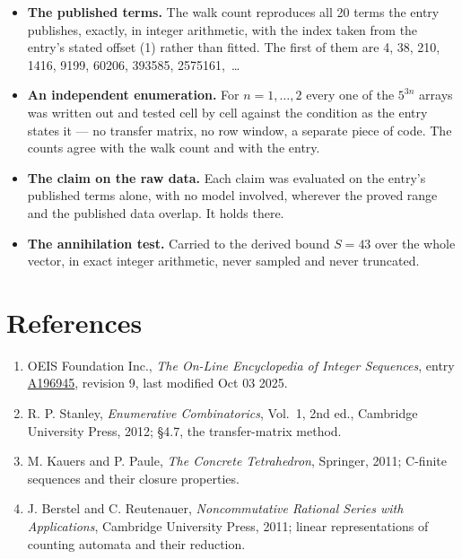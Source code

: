 \documentclass[11pt]{article}
\theoremstyle{definition}
\begin{document}
\begin{itemize}

\item {\bfseries The published terms.} The walk count reproduces all 20 terms the entry publishes, exactly, in integer arithmetic, with the index taken from the entry's stated offset (1) rather than fitted. The first of them are 4, 38, 210, 1416, 9199, 60206, 393585, 2575161,~\dots

\item {\bfseries An independent enumeration.} For $n = 1,\dots,2$ every one of the $5^{3n}$ arrays was written out and tested cell by cell against the condition as the entry states it --- no transfer matrix, no row window, a separate piece of code. The counts agree with the walk count and with the entry.

\item {\bfseries The claim on the raw data.} Each claim was evaluated on the entry's published terms alone, with no model involved, wherever the proved range and the published data overlap. It holds there.

\item {\bfseries The annihilation test.} Carried to the derived bound $S = 43$ over the whole vector, in exact integer arithmetic, never sampled and never truncated.

\end{itemize}

\section{References}

\begin{enumerate}

\item OEIS Foundation Inc., \emph{The On-Line Encyclopedia of Integer Sequences}, entry \href{https://oeis.org/A196945}{A196945}, revision 9, last modified Oct 03 2025.

\item R. P. Stanley, \emph{Enumerative Combinatorics}, Vol.~1, 2nd ed., Cambridge University Press, 2012; \S4.7, the transfer-matrix method.

\item M. Kauers and P. Paule, \emph{The Concrete Tetrahedron}, Springer, 2011; C-finite sequences and their closure properties.

\item J. Berstel and C. Reutenauer, \emph{Noncommutative Rational Series with Applications}, Cambridge University Press, 2011; linear representations of counting automata and their reduction.

\end{enumerate}
\end{document}
